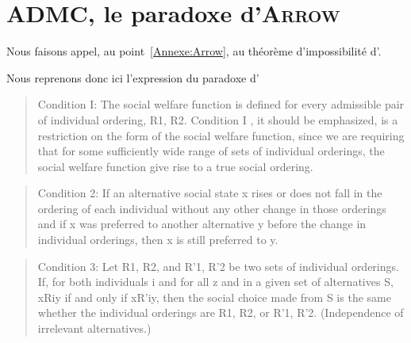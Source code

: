 \section{ADMC, le paradoxe d'\textsc{Arrow}}
\label{Arrow}

Nous faisons appel, au point~\ref{Annexe:Arrow}, au théorème d'impossibilité d'\citeauthor{arrow_difficulty_1950}.

Nous reprenons donc ici l'expression du paradoxe d'\citeauthor{arrow_difficulty_1950}~\cite{arrow_difficulty_1950}

\blockcquote{arrow_difficulty_1950}{
Condition I: The social welfare function is defined for every admissible pair of individual ordering, R1, R2.
Condition I , it should be emphasized, is a restriction on the form of the social welfare function, since we are requiring that for some sufficiently wide range of sets of individual orderings, the social welfare function give rise to a true social ordering.}

\blockcquote{arrow_difficulty_1950}{
Condition 2: If an alternative social state x rises or does not fall in the ordering of each individual without any other change in those orderings and if x was preferred to another alternative y before the change in individual orderings, then x is still preferred to y.}

\blockcquote{arrow_difficulty_1950}{
Condition 3: Let R1, R2, and R'1, R'2 be two sets of individual orderings.
If, for both individuals i and for all z and in a given set of alternatives S, xRiy if and only if xR'iy, then the social choice made from S is the same whether the individual orderings are R1, R2, or R'1, R'2.
(Independence of irrelevant alternatives.)}

